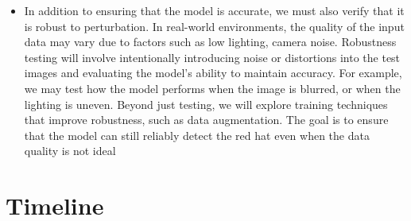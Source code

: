 \documentclass{article}
\begin{document}
\begin{itemize}
    \item In addition to ensuring that the model is accurate, we must also verify that it is robust to perturbation. In real-world environments, the quality of the input data may vary due to factors such as low lighting, camera noise. Robustness testing will involve intentionally introducing noise or distortions into the test images and evaluating the model’s ability to maintain accuracy. For example, we may test how the model performs when the image is blurred, or when the lighting is uneven. Beyond just testing, we will explore training techniques that improve robustness, such as data augmentation. The goal is to ensure that the model can still reliably detect the red hat even when the data quality is not ideal
\end{itemize}
 \section{Timeline}
\end{document}
